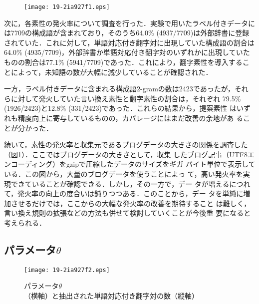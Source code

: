 \documentclass[japanese]{jnlp_1.4}
\begin{document}
\begin{table}[b]
\label{tab:comparison}

\end{table}

\begin{figure}[b]
 \begin{center}
 \texttt{[image: 19-2ia927f1.eps]}
 \end{center}
  \label{fig:feature-coverage}
\end{figure}

次に，各素性の発火率について調査を行った．実験で用いたラベル付きデータに
は7709の構成語が含まれており，そのうち64.0\% (4937/7709)は外部辞書に登録
されていた．これに対して，単語対応付き翻字対に出現していた構成語の割合は
64.0\% (4935/7709)，外部辞書か単語対応付き翻字対のいずれかに出現していた
ものの割合は77.1\% (5941/7709)であった．これにより，翻字素性を導入するこ
とによって，未知語の数が大幅に減少していることが確認された．

一方，ラベル付きデータに含まれる構成語$2$-gramの数は2423であったが，それ
らに対して発火していた言い換え素性と翻字素性の割合は，それぞれ
79.5\% (1926/2423)と12.8\% (331/2423)であった．これらの結果から，提案素性
はいずれも精度向上に寄与しているものの，カバレージにはまだ改善の余地があ
ることが分かった．

続いて，素性の発火率と収集元であるブログデータの大きさの関係を調査した
（図\ref{fig:feature-coverage}）．ここではブログデータの大きさとして，収集
したブログ記事（UTF8エンコーディング）をgzipで圧縮したデータのサイズをギガ
バイト単位で表示している．この図から，大量のブログデータを使うことによっ
て，高い発火率を実現できていることが確認できる．しかし，その一方で，デー
タが増えるにつれて，発火率の向上の度合いは鈍りつつある．このことから，デー
タを単純に増加させるだけでは，ここからの大幅な発火率の改善を期待すること
は難しく，言い換え規則の拡張などの方法も併せて検討していくことが今後重
要になると考えられる．

\subsection{パラメータ$\theta$}
 \label{sec:threshold}

\begin{figure}[b]
 \begin{center}
 \texttt{[image: 19-2ia927f2.eps]}
 \end{center}
  \caption{パラメータ$\theta$（横軸）と抽出された単語対応付き翻字対の数（縦軸）}
  \label{fig:size}
\end{figure}
\end{document}
